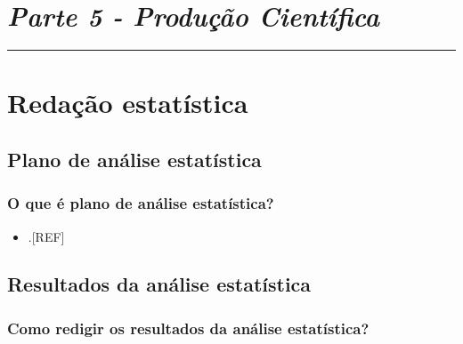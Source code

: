 \documentclass[
  a4paper,
]{book}
\providecommand{\tightlist}{%
  \setlength{\itemsep}{0pt}\setlength{\parskip}{0pt}}
\begin{document}

\hypertarget{parte-5---produuxe7uxe3o-cientuxedfica}{%
\chapter*{\texorpdfstring{\emph{Parte 5 - Produção Científica}}{Parte 5 - Produção Científica}}\label{parte-5---produuxe7uxe3o-cientuxedfica}}

\markboth{}{}
\par\noindent\rule{\textwidth}{0.05in}

\hypertarget{redacao}{%
\chapter{\texorpdfstring{\textbf{Redação estatística}}{Redação estatística}}\label{redacao}}

\hypertarget{plano-analise-estatistica}{%
\section{Plano de análise estatística}\label{plano-analise-estatistica}}

\hypertarget{o-que-uxe9-plano-de-anuxe1lise-estatuxedstica}{%
\subsection{O que é plano de análise estatística?}\label{o-que-uxe9-plano-de-anuxe1lise-estatuxedstica}}

\begin{itemize}
\tightlist
\item
  .{[}REF{]}
\end{itemize}

\hypertarget{resultados-analise-estatistica}{%
\section{Resultados da análise estatística}\label{resultados-analise-estatistica}}

\hypertarget{como-redigir-os-resultados-da-anuxe1lise-estatuxedstica}{%
\subsection{Como redigir os resultados da análise estatística?}\label{como-redigir-os-resultados-da-anuxe1lise-estatuxedstica}}
\end{document}
